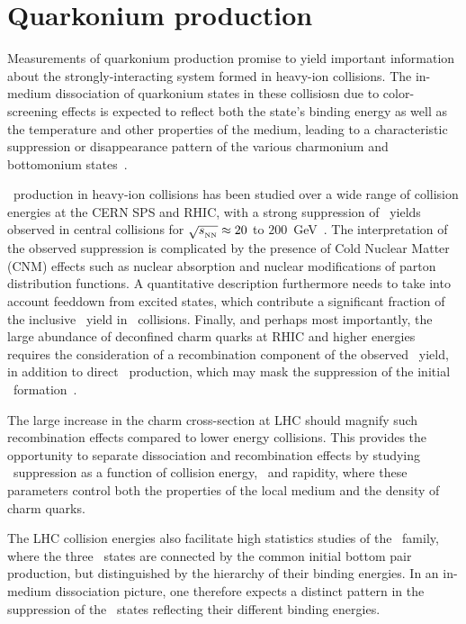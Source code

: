 \section{Quarkonium production}
\label{sec:qurkonia}
Measurements of quarkonium production promise to yield important information about the
strongly-interacting system formed in heavy-ion collisions.  
The in-medium dissociation of quarkonium states in these collisiosn due to color-screening effects
is expected to reflect both the state's binding energy as
well as the temperature and other properties of the medium, leading to a characteristic
suppression or disappearance pattern of the various charmonium and 
bottomonium states~\cite{Matsui:1986dk,Digal:2001ue,Mocsy:2007jz}.

\jpsi\ production in heavy-ion collisions has been studied over a wide range of
collision energies at the CERN SPS and RHIC, with a strong suppression of \jpsi\
yields observed in central collisions for $\sqrt{s_{_{\rm NN}}} \approx 20$ to
$200$~GeV~\cite{Baglin:1994ui,Alessandro:2004ap,Alessandro:2006ju,Adare:2006ns,
Arnaldi:2007zz,Adare:2011yf}.
The interpretation of the observed suppression is complicated by the presence
of Cold Nuclear Matter (CNM) effects such as nuclear absorption and nuclear
modifications of parton distribution functions. A quantitative
description furthermore needs to take into account feeddown from excited states,
which contribute a significant fraction of the inclusive \jpsi\ yield in \pp\ collisions.
Finally, and perhaps most importantly, the large abundance of deconfined charm quarks
at RHIC and higher energies requires the consideration of a recombination 
component of the observed \jpsi\ yield, in addition to direct \jpsi\ production, which 
may mask the suppression of the initial
\jpsi\ formation~\cite{BraunMunzinger:2000px,Thews:2000rj,Zhao:2007hh,Capella:2007jv}.

The large increase in the charm cross-section at LHC should magnify such recombination
effects compared to lower energy collisions. This provides the opportunity to separate
dissociation and recombination effects by studying \jpsi\ suppression
as a function of collision energy, \pT\ and rapidity, where these parameters
control both the properties of the local medium and the density of charm quarks.

The LHC collision energies also facilitate high statistics studies of the \PgU\ family, where
the three \PgUn\ states are connected by the common initial bottom pair production,
but distinguished by the hierarchy of their binding energies. In an
in-medium dissociation picture, one therefore expects a distinct pattern in the suppression
of the \PgUn\ states reflecting their different binding energies.

